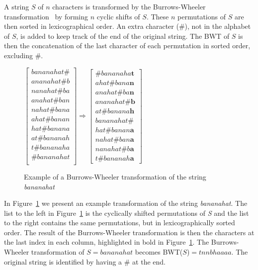A string $S$ of $n$ characters is transformed by the Burrows-Wheeler transformation~ by forming $n$ cyclic shifts of $S$. 
These $n$ permutations of $S$ are then sorted in lexicographical order.
An extra character (\#), not in the alphabet of $S$, is added to keep track of the end of the original string.
The BWT of $S$ is then the concatenation of the last character of each permutation in sorted order, excluding $\#$.

\begin{figure}
\begin{center}
$\begin{bmatrix}
	bananahat\#\\
	ananahat\#b\\
	nanahat\#ba\\
	anahat\#ban\\
	nahat\#bana\\
	ahat\#banan\\
	hat\#banana\\
	at\#bananah\\
	t\#bananaha\\
	\#bananahat\\
\end{bmatrix} \Rightarrow
\begin{bmatrix}
	\#bananaha\textbf{t}\\
	ahat\#bana\textbf{n}\\
	anahat\#ba\textbf{n}\\
	ananahat\#\textbf{b}\\
	at\#banana\textbf{h}\\
	bananahat\#\\
	hat\#banan\textbf{a}\\
	nahat\#ban\textbf{a}\\
	nanahat\#b\textbf{a}\\
	t\#bananah\textbf{a}
\end{bmatrix}$
\end{center}
\caption{Example of a Burrows-Wheeler transformation of the string \textit{bananahat}}
\label{fig:BWTExample}
\end{figure}
In Figure~\ref{fig:BWTExample} we present an example transformation of the string \textit{bananahat}.
The list to the left in Figure~\ref{fig:BWTExample} is the cyclically shifted permutations of \textit{S} and the list to the right contains the same permutations, but in lexicographically sorted order.
The result of the Burrows-Wheeler transformation is then the characters at the last index in each column, highlighted in bold in Figure~\ref{fig:BWTExample}.
The Burrows-Wheeler transformation of $S=bananahat$ becomes BWT($S$)$ = tnnbhaaaa$.
The original string is identified by having a \# at the end.


